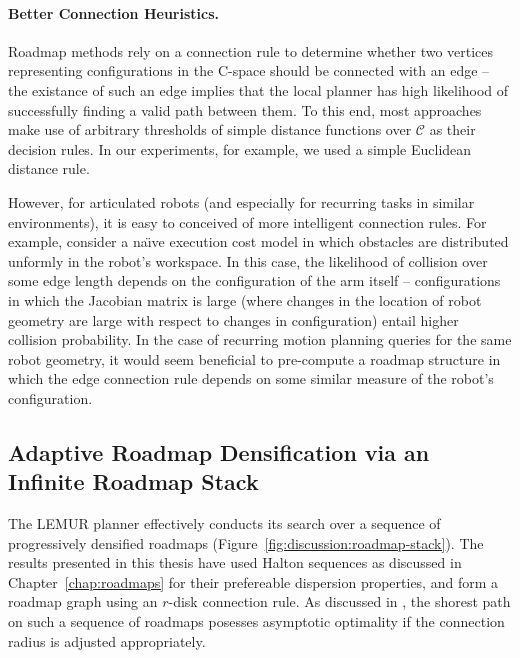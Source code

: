 \paragraph{Better Connection Heuristics.}
Roadmap methods rely on a connection rule to determine whether
two vertices representing configurations in the C-space
should be connected with an edge
-- the existance of such an edge implies that the local planner
has high likelihood of successfully finding a valid path between them.
To this end,
most approaches make use of arbitrary thresholds of
simple distance functions over $\mathcal{C}$ as their decision rules.
In our experiments, for example,
we used a simple Euclidean distance rule.

However, for articulated robots
(and especially for recurring tasks in similar environments),
it is easy to conceived of more intelligent connection rules.
For example, consider a na\"{\i}ve execution cost model in which
obstacles are distributed unformly in the robot's workspace.
In this case,
the likelihood of collision over some edge length
depends on the configuration of the arm itself
-- configurations in which the Jacobian matrix is large
(where changes in the location of robot geometry are large
with respect to changes in configuration)
entail higher collision probability.
In the case of recurring motion planning queries for the same
robot geometry,
it would seem beneficial to pre-compute a roadmap structure
in which the edge connection rule depends on some similar measure
of the robot's configuration.


\subsection{Adaptive Roadmap Densification via an Infinite Roadmap Stack}
\label{subsec:conclusion:infinite-stack}

\label{sec:discussion:disc}
The LEMUR planner effectively conducts its search over a sequence of
progressively densified roadmaps
(Figure~\ref{fig:discussion:roadmap-stack}).
The results presented in this thesis have used Halton sequences
as discussed in Chapter~\ref{chap:roadmaps}
for their prefereable dispersion properties,
and form a roadmap graph using an $r$-disk connection rule.
As discussed in \citep{janson2015deterministicsampling},
the shorest path on such a sequence of roadmaps
posesses asymptotic optimality if the connection radius is adjusted
appropriately.

